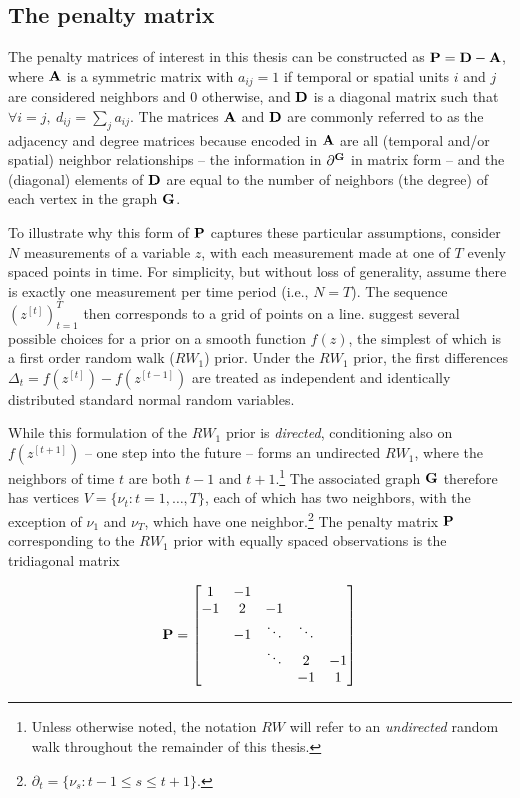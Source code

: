 \subsection{The penalty matrix} 
\label{penalty_matrix}

The penalty matrices of interest in this thesis 
can be constructed as $\mathbf{P} = \mathbf{D} - \mathbf{A}$, where $\mathbf{A}$ is a symmetric 
matrix with $a_{ij} = 1$ if temporal or spatial units $i$ and $j$ are considered neighbors and 
0 otherwise, and $\mathbf{D}$ is a diagonal matrix such that 
$\forall i = j, \: d_{ij} = \sum_j a_{ij}$. The matrices $\mathbf{A}$ and $\mathbf{D}$ are 
commonly referred to as the adjacency and degree matrices because encoded in 
$\mathbf{A}$ are all (temporal and/or spatial) neighbor relationships -- the information 
in $\partial^{\mathbf{G}}$ in matrix form -- and the (diagonal) elements of $\mathbf{D}$ 
are equal to the number of neighbors (the degree) of each vertex in the 
graph $\mathbf{G}$. 

To illustrate why this form of $\mathbf{P}$ captures these particular assumptions, 
consider $N$ measurements of a variable $z$, with each measurement made at 
one of $T$ evenly spaced points in time. For simplicity, but without loss of generality,  
assume there is exactly one measurement per time period (i.e., $N = T$).  
The sequence $(z^{[t]})_{t=1}^T$ then corresponds to a grid of points on a line. 
 suggest several possible choices for a prior on a smooth
function $f(z)$, the simplest of which is a first order random walk ($RW_1$) prior.  Under 
the $RW_1$ prior, the first differences $\Delta_t = f(z^{[t]}) - f(z^{[t-1]})$ are treated as 
independent and identically distributed standard normal random variables. 

While this formulation of the $RW_1$ prior is {\it directed}, conditioning also on 
$f(z^{[t+1]})$ -- one step into the future -- forms an undirected $RW_1$, where 
the neighbors of time $t$ are both $t-1$ and $t+1$.\footnote{Unless otherwise 
noted, the notation $RW$ will refer to an {\it undirected} random walk throughout 
the remainder of this thesis.} The associated graph $\mathbf{G}$ therefore has vertices 
$V=\{\nu_t : t=1,\dots,T\}$, each of which has two neighbors, with the exception of 
$\nu_1$ and $\nu_T$, which have one neighbor.\footnote{$\partial_t = \{\nu_{s} : t - 1 \leq s \leq t + 1\}.$}  
The penalty matrix $\mathbf{P}$ corresponding to the $RW_1$ prior with equally 
spaced observations is the tridiagonal matrix

\begin{equation*}
\mathbf{P} = 
\begin{bmatrix}
1  	& -1 	& 		& 	& \\
-1  	& 2 	& -1 		& 	& \\
  	& -1 & \ddots 	& \ddots	& \\
  	&  	& \ddots 	& 2 	& -1\\
  	&  	& 		& -1 	& 1\\
\end{bmatrix}
\end{equation*}

